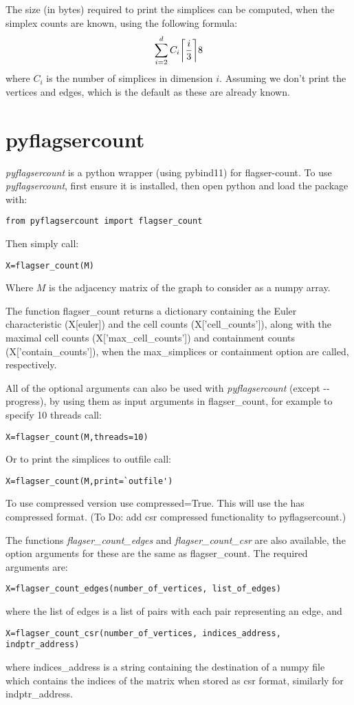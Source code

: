 \documentclass{amsart}
\theoremstyle{definition}
\let\originalleft\left
\let\originalright\right
\renewcommand{\left}{\mathopen{}\mathclose\bgroup\originalleft}
\renewcommand{\right}{\aftergroup\egroup\originalright}
\begin{document}
The size (in bytes) required to print the simplices can be computed, when the simplex counts are known, using the following formula:
$$ \sum_{i=2}^{d}C_i\left\lceil\frac{i}{3}\right\rceil8$$
where $C_i$ is the number of simplices in dimension $i$. Assuming we don't print the vertices and edges, which is the default as these are already known.

\section{pyflagsercount}
\textit{pyflagsercount} is a python wrapper (using pybind11) for flagser-count.
To use \textit{pyflagsercount}, first ensure it is installed, then open python and load the package with:
\begin{verbatim}from pyflagsercount import flagser_count\end{verbatim}
Then simply call:
\begin{verbatim}X=flagser_count(M)\end{verbatim}
Where $M$ is the adjacency matrix of the graph to consider as a numpy array.

The function flagser\_count returns a dictionary containing the Euler characteristic (X[euler]) and the cell counts (X['cell\_counts']), along with the maximal cell counts (X['max\_cell\_counts']) and containment counts (X['contain\_counts']), when the max\_simplices or containment option are called, respectively.

All of the optional arguments can also be used with \textit{pyflagsercount} (except -{}-progress), by using them as input arguments in flagser\_count, for example to specify 10 threads call:
\begin{verbatim}X=flagser_count(M,threads=10)\end{verbatim}
Or to print the simplices to outfile call:
\begin{verbatim}X=flagser_count(M,print=`outfile')\end{verbatim}

To use compressed version use compressed=True. This will use the has compressed format. (To Do: add csr compressed functionality to pyflagsercount.)

The functions \textit{flagser\_count\_edges} and \textit{flagser\_count\_csr} are also available, the option arguments for these are the same as flagser\_count. The required arguments are:
\begin{verbatim}X=flagser_count_edges(number_of_vertices, list_of_edges)\end{verbatim}
where the list of edges is a list of pairs with each pair representing an edge, and
\begin{verbatim}X=flagser_count_csr(number_of_vertices, indices_address, indptr_address)\end{verbatim}
where indices\_address is a string containing the destination of a numpy file which contains the indices of the matrix when stored as csr format, similarly for indptr\_address.
\end{document}

